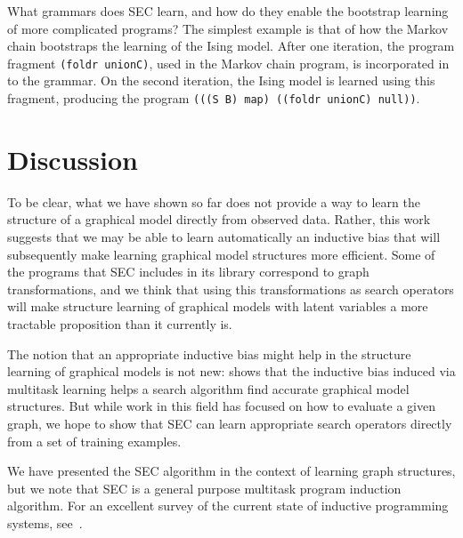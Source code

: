 \documentclass{article} %
\begin{document}
What grammars does SEC learn, and how do they enable the bootstrap learning of more complicated programs?
The simplest example is that of how the Markov chain bootstraps the learning of the Ising model.
After one iteration, the program fragment \verb|(foldr unionC)|, used in the Markov chain program, is incorporated in to the grammar.
On the second iteration, the Ising model is learned using this fragment, producing the program \verb|(((S B) map) ((foldr unionC) null))|.

\section{Discussion}

To be clear, what we have shown so far does not provide a way to learn the structure of a graphical model directly from observed data. Rather, this work suggests that we may be able to learn automatically an inductive bias that will subsequently make learning graphical model structures more efficient. Some of the programs that SEC includes in its library correspond to graph transformations, and we think that using this transformations as search operators will make structure learning of graphical models with latent variables a more tractable proposition than it currently is. 

The notion that an appropriate inductive bias might help in the structure learning of graphical models is not new: \citep{DBLP:conf/icml/HonorioS10} shows that the inductive bias induced via multitask learning helps a search algorithm find accurate graphical model structures. But while work in this field has focused on how to evaluate a given graph, we hope to show that SEC can learn appropriate search operators directly from a set of training examples. 

We have presented the SEC algorithm in the context of learning graph structures, but we note that SEC is a general purpose multitask program induction algorithm. For an excellent survey of the current state of inductive programming systems, see~\citep{DBLP:conf/aaip/Kitzelmann09}. 



\end{document}
